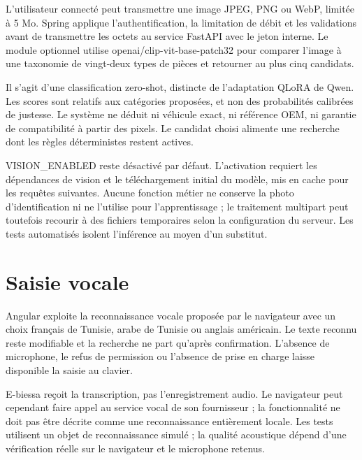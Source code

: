 L'utilisateur connecté peut transmettre une image JPEG, PNG ou WebP, limitée à 5 Mo. Spring applique l'authentification, la limitation de débit et les validations avant de transmettre les octets au service FastAPI avec le jeton interne. Le module optionnel utilise openai/clip-vit-base-patch32 pour comparer l'image à une taxonomie de vingt-deux types de pièces et retourner au plus cinq candidats.


Il s'agit d'une classification zero-shot, distincte de l'adaptation QLoRA de Qwen. Les scores sont relatifs aux catégories proposées, et non des probabilités calibrées de justesse. Le système ne déduit ni véhicule exact, ni référence OEM, ni garantie de compatibilité à partir des pixels. Le candidat choisi alimente une recherche dont les règles déterministes restent actives.


VISION\_ENABLED reste désactivé par défaut. L'activation requiert les dépendances de vision et le téléchargement initial du modèle, mis en cache pour les requêtes suivantes. Aucune fonction métier ne conserve la photo d'identification ni ne l'utilise pour l'apprentissage ; le traitement multipart peut toutefois recourir à des fichiers temporaires selon la configuration du serveur. Les tests automatisés isolent l'inférence au moyen d'un substitut.


\section{Saisie vocale}

Angular exploite la reconnaissance vocale proposée par le navigateur avec un choix français de Tunisie, arabe de Tunisie ou anglais américain. Le texte reconnu reste modifiable et la recherche ne part qu'après confirmation. L'absence de microphone, le refus de permission ou l'absence de prise en charge laisse disponible la saisie au clavier.


E-biessa reçoit la transcription, pas l'enregistrement audio. Le navigateur peut cependant faire appel au service vocal de son fournisseur ; la fonctionnalité ne doit pas être décrite comme une reconnaissance entièrement locale. Les tests utilisent un objet de reconnaissance simulé ; la qualité acoustique dépend d'une vérification réelle sur le navigateur et le microphone retenus.
